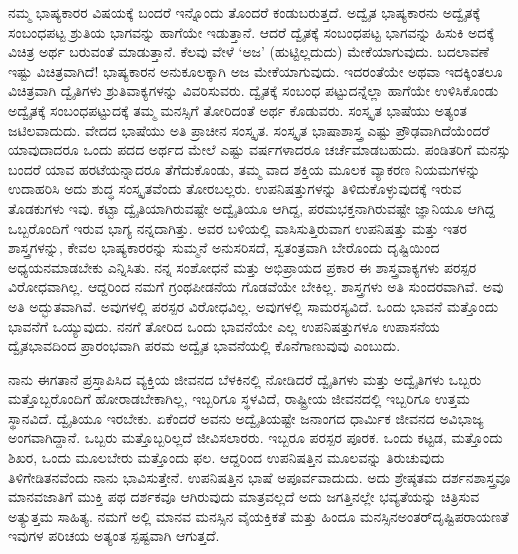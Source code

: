 ನಮ್ಮ ಭಾಷ್ಯಕಾರರ ವಿಷಯಕ್ಕೆ ಬಂದರೆ ಇನ್ನೊಂದು ತೊಂದರೆ ಕಂಡುಬರುತ್ತದೆ. ಅದ್ವೈತ ಭಾಷ್ಯಕಾರನು ಅದ್ವೈತಕ್ಕೆ ಸಂಬಂಧಪಟ್ಟ ಶ್ರುತಿಯ ಭಾಗವನ್ನು ಹಾಗೆಯೇ ಇಡುತ್ತಾನೆ. ಆದರೆ ದ್ವೈತಕ್ಕೆ ಸಂಬಂಧಪಟ್ಟ ಭಾಗವನ್ನು ಹಿಸುಕಿ ಅದಕ್ಕೆ ವಿಚಿತ್ರ ಅರ್ಥ ಬರುವಂತೆ ಮಾಡುತ್ತಾನೆ. ಕೆಲವು ವೇಳೆ ‘ಅಜ’ (ಹುಟ್ಟಿಲ್ಲದುದು) ಮೇಕೆಯಾಗುವುದು. ಬದಲಾವಣೆ ಇಷ್ಟು ವಿಚಿತ್ರವಾಗಿದೆ! ಭಾಷ್ಯಕಾರನ ಅನುಕೂಲಕ್ಕಾಗಿ ಅಜ ಮೇಕೆಯಾಗುವುದು. ಇದರಂತೆಯೇ ಅಥವಾ ಇದಕ್ಕಿಂತಲೂ ವಿಚಿತ್ರವಾಗಿ ದ್ವೈತಿಗಳು ಶ್ರುತಿವಾಕ್ಯಗಳನ್ನು ವಿವರಿಸುವರು. ದ್ವೈತಕ್ಕೆ ಸಂಬಂಧ ಪಟ್ಟುದನ್ನೆಲ್ಲಾ ಹಾಗೆಯೇ ಉಳಿಸಿಕೊಂಡು ಅದ್ವೈತಕ್ಕೆ ಸಂಬಂಧಪಟ್ಟುದಕ್ಕೆ ತಮ್ಮ ಮನಸ್ಸಿಗೆ ತೋರಿದಂತೆ ಅರ್ಥ ಕೊಡುವರು. ಸಂಸ್ಕೃತ ಭಾಷೆಯು ಅತ್ಯಂತ ಜಟಿಲವಾದುದು. ವೇದದ ಭಾಷೆಯು ಅತಿ ಪ್ರಾಚೀನ ಸಂಸ್ಕೃತ. ಸಂಸ್ಕೃತ ಭಾಷಾಶಾಸ್ತ್ರ ಎಷ್ಟು ಪ್ರೌಢವಾಗಿದೆಯೆಂದರೆ ಯಾವುದಾದರೂ ಒಂದು ಪದದ ಅರ್ಥದ ಮೇಲೆ ಎಷ್ಟು ವರ್ಷಗಳಾದರೂ ಚರ್ಚೆಮಾಡಬಹುದು. ಪಂಡಿತರಿಗೆ ಮನಸ್ಸು ಬಂದರೆ ಯಾವ ಹರಟೆಯನ್ನಾದರೂ ತೆಗೆದುಕೊಂಡು, ತಮ್ಮ ವಾದ ಶಕ್ತಿಯ ಮೂಲಕ ವ್ಯಾಕರಣ ನಿಯಮಗಳನ್ನು ಉದಾಹರಿಸಿ ಅದು ಶುದ್ಧ ಸಂಸ್ಕೃತವೆಂದು ತೋರಬಲ್ಲರು. ಉಪನಿಷತ್ತುಗಳನ್ನು ತಿಳಿದುಕೊಳ್ಳುವುದಕ್ಕೆ ಇರುವ ತೊಡಕುಗಳು ಇವು. ಕಟ್ಟಾ ದ್ವೈತಿಯಾಗಿರುವಷ್ಟೇ ಅದ್ವೈತಿಯೂ ಆಗಿದ್ದ, ಪರಮಭಕ್ತನಾಗಿರುವಷ್ಟೇ ಜ್ಞಾನಿಯೂ ಆಗಿದ್ದ ಒಬ್ಬರೊಂದಿಗೆ ಇರುವ ಭಾಗ್ಯ ನನ್ನದಾಗಿತ್ತು. ಅವರ ಬಳಿಯಲ್ಲಿ ವಾಸಿಸುತ್ತಿರುವಾಗ ಉಪನಿಷತ್ತು ಮತ್ತು ಇತರ ಶಾಸ್ತ್ರಗಳನ್ನು, ಕೇವಲ ಭಾಷ್ಯಕಾರರನ್ನು ಸುಮ್ಮನೆ ಅನುಸರಿಸದೆ, ಸ್ವತಂತ್ರವಾಗಿ ಬೇರೊಂದು ದೃಷ್ಟಿಯಿಂದ ಅಧ್ಯಯನಮಾಡಬೇಕು ಎನ್ನಿಸಿತು. ನನ್ನ ಸಂಶೋಧನೆ ಮತ್ತು ಅಭಿಪ್ರಾಯದ ಪ್ರಕಾರ ಈ ಶಾಸ್ತ್ರವಾಕ್ಯಗಳು ಪರಸ್ಪರ ವಿರೋಧವಾಗಿಲ್ಲ. ಆದ್ದರಿಂದ ನಮಗೆ ಗ್ರಂಥಪೀಡನೆಯ ಗೊಡವೆಯೇ ಬೇಕಿಲ್ಲ. ಶಾಸ್ತ್ರಗಳು ಅತಿ ಸುಂದರವಾಗಿವೆ. ಅವು ಅತಿ ಅದ್ಭುತವಾಗಿವೆ. ಅವುಗಳಲ್ಲಿ ಪರಸ್ಪರ ವಿರೋಧವಿಲ್ಲ. ಅವುಗಳಲ್ಲಿ ಸಾಮರಸ್ಯವಿದೆ. ಒಂದು ಭಾವನೆ ಮತ್ತೊಂದು ಭಾವನೆಗೆ ಒಯ್ಯುವುದು. ನನಗೆ ತೋರಿದ ಒಂದು ಭಾವನೆಯೇ ಎಲ್ಲ ಉಪನಿಷತ್ತುಗಳೂ ಉಪಾಸನೆಯ ದ್ವೈತಭಾವದಿಂದ ಪ್ರಾರಂಭವಾಗಿ ಪರಮ ಅದ್ವೈತ ಭಾವನೆಯಲ್ಲಿ ಕೊನೆಗಾಣುವುವು ಎಂಬುದು.

ನಾನು ಈಗತಾನೆ ಪ್ರಸ್ತಾಪಿಸಿದ ವ್ಯಕ್ತಿಯ ಜೀವನದ ಬೆಳಕಿನಲ್ಲಿ ನೋಡಿದರೆ ದ್ವೈತಿಗಳು ಮತ್ತು ಅದ್ವೈತಿಗಳು ಒಬ್ಬರು ಮತ್ತೊಬ್ಬರೊಂದಿಗೆ ಹೋರಾಡಬೇಕಾಗಿಲ್ಲ, ಇಬ್ಬರಿಗೂ ಸ್ಥಳವಿದೆ, ರಾಷ್ಟ್ರೀಯ ಜೀವನದಲ್ಲಿ ಇಬ್ಬರಿಗೂ ಉತ್ತಮ ಸ್ಥಾನವಿದೆ. ದ್ವೈತಿಯೂ ಇರಬೇಕು. ಏಕೆಂದರೆ ಅವನು ಅದ್ವೈತಿಯಷ್ಟೇ ಜನಾಂಗದ ಧಾರ್ಮಿಕ ಜೀವನದ ಅವಿಭಾಜ್ಯ ಅಂಗವಾಗಿದ್ದಾನೆ. ಒಬ್ಬರು ಮತ್ತೊಬ್ಬರಿಲ್ಲದೆ ಜೀವಿಸಲಾರರು. ಇಬ್ಬರೂ ಪರಸ್ಪರ ಪೂರಕ. ಒಂದು ಕಟ್ಟಡ, ಮತ್ತೊಂದು ಶಿಖರ, ಒಂದು ಮೂಲಬೇರು ಮತ್ತೊಂದು ಫಲ. ಆದ್ದರಿಂದ ಉಪನಿಷತ್ತಿನ ಮೂಲವನ್ನು ತಿರುಚುವುದು ತಿಳಿಗೇಡಿತನವೆಂದು ನಾನು ಭಾವಿಸುತ್ತೇನೆ. ಉಪನಿಷತ್ತಿನ ಭಾಷೆ ಅಪೂರ್ವವಾದುದು. ಅದು ಶ್ರೇಷ್ಠತಮ ದರ್ಶನಶಾಸ್ತ್ರವೂ ಮಾನವಜಾತಿಗೆ ಮುಕ್ತಿ ಪಥ ದರ್ಶಕವೂ ಆಗಿರುವುದು ಮಾತ್ರವಲ್ಲದೆ ಅದು ಜಗತ್ತಿನಲ್ಲೇ ಭವ್ಯತೆಯನ್ನು ಚಿತ್ರಿಸುವ ಅತ್ಯುತ್ತಮ ಸಾಹಿತ್ಯ. ನಮಗೆ ಅಲ್ಲಿ ಮಾನವ ಮನಸ್ಸಿನ ವೈಯಕ್ತಿಕತೆ ಮತ್ತು ಹಿಂದೂ ಮನಸ್ಸಿನ\break ಅಂತರ್​ದೃಷ್ಟಿಪರಾಯಣತೆ ಇವುಗಳ ಪರಿಚಯ ಅತ್ಯಂತ ಸ್ಪಷ್ಟವಾಗಿ ಆಗುತ್ತದೆ.

